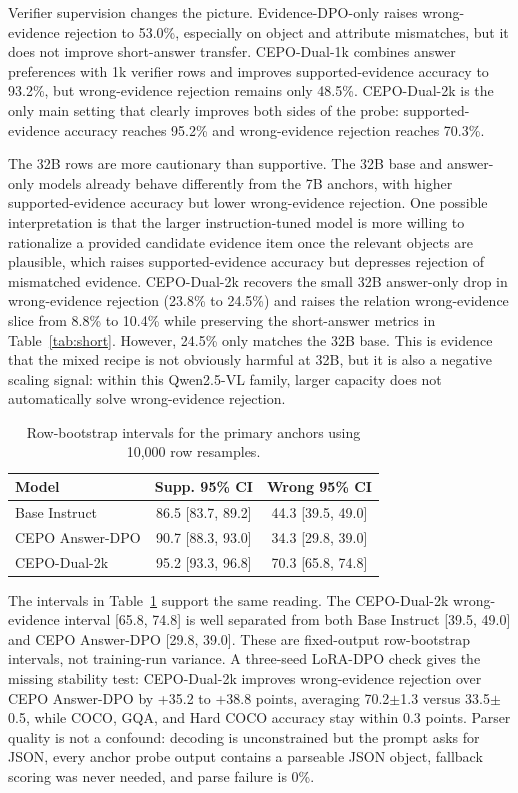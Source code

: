 \documentclass[10pt,twocolumn,letterpaper]{article}
\newcommand{\answerdpo}{CEPO Answer-DPO}
\newcommand{\evidencedpo}{Evidence-DPO-only}
\newcommand{\dualonek}{CEPO-Dual-1k}
\newcommand{\dualtwok}{CEPO-Dual-2k}
\begin{document}
Verifier supervision changes the picture. \evidencedpo{} raises
wrong-evidence rejection to 53.0\%, especially on object and attribute
mismatches, but it does not improve short-answer transfer. \dualonek{} combines
answer preferences with 1k verifier rows and improves supported-evidence
accuracy to 93.2\%, but wrong-evidence rejection remains only 48.5\%.
\dualtwok{} is the only main setting that clearly improves both sides of the
probe: supported-evidence accuracy reaches 95.2\% and wrong-evidence rejection
reaches 70.3\%.

The 32B rows are more cautionary than supportive. The 32B base and answer-only
models already behave differently from the 7B anchors, with higher
supported-evidence accuracy but lower wrong-evidence rejection. One possible
interpretation is that the larger instruction-tuned model is more willing to
rationalize a provided candidate evidence item once the relevant objects are
plausible, which raises supported-evidence accuracy but depresses rejection of
mismatched evidence. \dualtwok{} recovers the small 32B answer-only drop in
wrong-evidence rejection (23.8\% to 24.5\%) and raises the relation
wrong-evidence slice from 8.8\% to 10.4\% while preserving the short-answer
metrics in Table~\ref{tab:short}. However, 24.5\% only matches the 32B base.
This is evidence that the mixed recipe is not obviously harmful at 32B, but it
is also a negative scaling signal: within this Qwen2.5-VL family, larger
capacity does not automatically solve wrong-evidence rejection.

\begin{table}[t]
\centering
\scriptsize
\setlength{\tabcolsep}{2.5pt}
\begin{tabular}{@{}lcc@{}}
\toprule
Model & Supp. 95\% CI & Wrong 95\% CI \\
\midrule
Base Instruct & 86.5 [83.7, 89.2] & 44.3 [39.5, 49.0] \\
\answerdpo{} & 90.7 [88.3, 93.0] & 34.3 [29.8, 39.0] \\
\dualtwok{} & 95.2 [93.3, 96.8] & 70.3 [65.8, 74.8] \\
\bottomrule
\end{tabular}
\caption{Row-bootstrap intervals for the primary anchors using 10{,}000 row
resamples.}
\label{tab:ci}
\end{table}

The intervals in Table~\ref{tab:ci} support the same reading. The
\dualtwok{} wrong-evidence interval [65.8, 74.8] is well separated from both
Base Instruct [39.5, 49.0] and \answerdpo{} [29.8, 39.0]. These are
fixed-output row-bootstrap intervals, not training-run variance. A three-seed
LoRA-DPO check gives the missing stability test: \dualtwok{} improves
wrong-evidence rejection over \answerdpo{} by +35.2 to +38.8 points, averaging
70.2$\pm$1.3 versus 33.5$\pm$0.5, while COCO, GQA, and Hard COCO accuracy stay
within 0.3 points. Parser quality is not a confound: decoding is unconstrained
but the prompt asks for JSON, every anchor probe output contains a parseable
JSON object, fallback scoring was never needed, and parse failure is 0\%.
\end{document}

